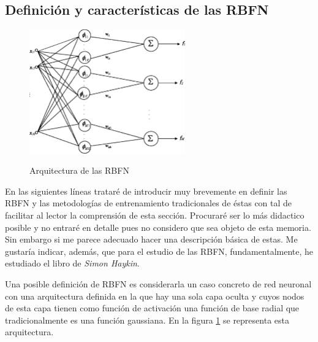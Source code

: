 \documentclass[10pt,a4paper]{report}
\begin{document}
\subsection{Definición y características de las RBFN}
\begin{figure}[h!]{}
    \centering
    \includegraphics[width=0.6\textwidth]{img/RBFN1.png}
    \label{fig:RBFN1}
    \caption{Arquitectura de las RBFN}
\end{figure}
En las siguientes líneas trataré de introducir muy brevemente en definir las RBFN y las metodologías de entrenamiento tradicionales de éstas con tal de facilitar al lector la comprensión de esta sección. Procuraré ser lo más didactico posible y no entraré en detalle pues no considero que sea objeto de esta memoria. Sin embargo si me parece adecuado hacer una descripción básica de estas. Me gustaría indicar, además, que para el estudio de las RBFN, fundamentalmente, he estudiado el libro de \textit{Simon Haykin}\cite{haykin99a}.

Una posible definición de RBFN es considerarla un caso concreto de red neuronal con una arquitectura definida en la que hay una sola capa oculta y cuyos nodos de esta capa tienen como función de activación una función de base radial que tradicionalmente es una función gaussiana. En la figura \ref{fig:RBFN1} se representa esta arquitectura. 
\end{document}
